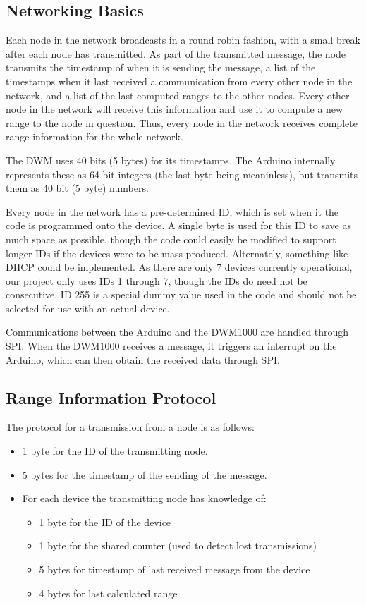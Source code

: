 \subsection{Networking Basics}
Each node in the network broadcasts in a round robin fashion, with a small break after each node has transmitted. As part of the transmitted message, the node transmits the timestamp of when it is sending the message, a list of the timestamps when it last received a communication from every other node in the network, and a list of the last computed ranges to the other nodes. Every other node in the network will receive this information and use it to compute a new range to the node in question. Thus, every node in the network receives complete range information for the whole network.

The DWM uses 40 bits (5 bytes) for its timestamps. The Arduino internally represents these as 64-bit integers (the last byte being meaninless), but transmits them as 40 bit (5 byte) numbers.

Every node in the network has a pre-determined ID, which is set when it the code is programmed onto the device. A single byte is used for this ID to save as much space as possible, though the code could easily be modified to support longer IDs if the devices were to be mass produced. Alternately, something like DHCP could be implemented. As there are only 7 devices currently operational, our project only uses IDs 1 through 7, though the IDs do need not be consecutive. ID 255 is a special dummy value used in the code and should not be selected for use with an actual device.

Communications between the Arduino and the DWM1000 are handled through SPI. When the DWM1000 receives a message, it triggers an interrupt on the Arduino, which can then obtain the received data through SPI.

\subsection{Range Information Protocol}
The protocol for a transmission from a node is as follows:

\begin{itemize}
	\item 1 byte for the ID of the transmitting node.
	\item 5 bytes for the timestamp of the sending of the message.
	\item For each device the transmitting node has knowledge of:
	\begin{itemize}
		\item 1 byte for the ID of the device
		\item 1 byte for the shared counter (used to detect lost transmissions)
		\item 5 bytes for timestamp of last received message from the device
		\item 4 bytes for last calculated range	
	\end{itemize} 
\end{itemize}

